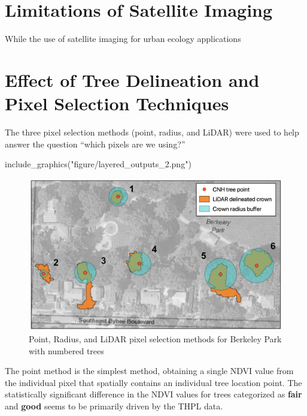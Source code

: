 \documentclass[12pt,twoside]{reedthesis}
\newenvironment{Shaded}{\begin{snugshade}}{\end{snugshade}}
\newcommand{\FunctionTok}[1]{\textcolor[rgb]{0.00,0.00,0.00}{#1}}
\newcommand{\NormalTok}[1]{#1}
\newcommand{\StringTok}[1]{\textcolor[rgb]{0.31,0.60,0.02}{#1}}
\begin{document}
\hypertarget{limitations-of-satellite-imaging}{%
\section{Limitations of Satellite Imaging}\label{limitations-of-satellite-imaging}}

While the use of satellite imaging for urban ecology applications

\hypertarget{effect-of-tree-delineation-and-pixel-selection-techniques}{%
\section{Effect of Tree Delineation and Pixel Selection Techniques}\label{effect-of-tree-delineation-and-pixel-selection-techniques}}

The three pixel selection methods (point, radius, and LiDAR) were used
to help answer the question ``which pixels are we using?''
\begin{Shaded}
\begin{Highlighting}[]
\FunctionTok{include\_graphics}\NormalTok{(}\StringTok{"figure/layered\_outputs\_2.png"}\NormalTok{)}
\end{Highlighting}
\end{Shaded}
\begin{figure}

{\centering \includegraphics[width=0.9\linewidth]{figure/layered_outputs_2} 

}

\caption[Pixel selection method comparison with numbered trees]{Point, Radius, and LiDAR pixel selection methods for Berkeley Park with numbered trees}\label{fig:layered-outputs-2}
\end{figure}
The point method is the simplest method, obtaining a single NDVI value
from the individual pixel that spatially contains an individual tree
location point. The statistically significant difference in the NDVI
values for trees categorized as \textbf{fair} and \textbf{good} seems to be
primarily driven by the THPL data.
\end{document}
